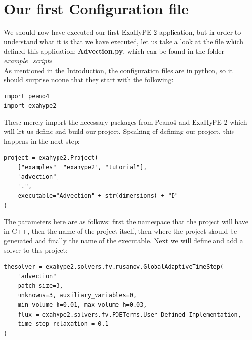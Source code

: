 \documentclass[12pt,letterpaper]{article}
\begin{document}
\newpage

\section{Our first Configuration file}
\label{section_3}


We should now have executed our first ExaHyPE 2 application, but in order to understand what it is that we have executed, let us take a look at the file which defined this application: \textbf{Advection.py}, which can be found in the folder \textit{example\_scripts}\\
As mentioned in the \hyperref[sec:Introduction]{Introduction}, the configuration files are in python, so it should surprise noone that they start with the following:

\begin{lstlisting}[style = Python]
import peano4
import exahype2
\end{lstlisting}

These merely import the necessary packages from Peano4 and ExaHyPE 2 which will let us define and build our project. Speaking of defining our project, this happens in the next step:\\

\begin{lstlisting}[style = Python]
project = exahype2.Project(
    ["examples", "exahype2", "tutorial"],
    "advection",
    ".",
    executable="Advection" + str(dimensions) + "D"
)
\end{lstlisting}

The parameters here are as follows: first the namespace that the project will have in C++, then the name of the project itself, then where the project should be generated and finally the name of the executable.
Next we will define and add a solver to this project:\\

\begin{lstlisting}[style = Python]
thesolver = exahype2.solvers.fv.rusanov.GlobalAdaptiveTimeStep(
    "advection",
    patch_size=3,
    unknowns=3, auxiliary_variables=0,
    min_volume_h=0.01, max_volume_h=0.03,
    flux = exahype2.solvers.fv.PDETerms.User_Defined_Implementation,
    time_step_relaxation = 0.1
)
\end{lstlisting}
\end{document}
